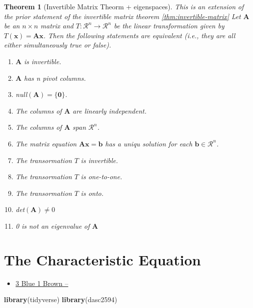 \documentclass[
]{book}
\newenvironment{Shaded}{\begin{snugshade}}{\end{snugshade}}
\newcommand{\KeywordTok}[1]{\textcolor[rgb]{0.13,0.29,0.53}{\textbf{#1}}}
\newcommand{\NormalTok}[1]{#1}
\providecommand{\tightlist}{%
  \setlength{\itemsep}{0pt}\setlength{\parskip}{0pt}}
\newtheorem{theorem}{Theorem}[chapter]
\theoremstyle{definition}
\theoremstyle{definition}
\theoremstyle{definition}
\theoremstyle{definition}
\theoremstyle{remark}
\begin{document}
\begin{theorem}[Invertible Matrix Theorm + eigenspaces]

This is an extension of the prior statement of the invertible matrix theorem \ref{thm:invertible-matrix}
Let \(\mathbf{A}\) be an \(n \times n\) matrix and \(T: \mathcal{R}^n \rightarrow \mathcal{R}^n\) be the linear transformation given by \(T(\mathbf{x}) = \mathbf{A}\mathbf{x}\). Then the following statements are equivalent (i.e., they are all either simultaneously true or false).

\begin{enumerate}
\def\labelenumi{\arabic{enumi})}
\item
  \(\mathbf{A}\) is invertible.
\item
  \(\mathbf{A}\) has n pivot columns.
\item
  null\((\mathbf{A}) = \{\mathbf{0}\}\).
\item
  The columns of \(\mathbf{A}\) are linearly independent.
\item
  The columns of \(\mathbf{A}\) span \(\mathcal{R}^n\).
\item
  The matrix equation \(\mathbf{A} \mathbf{x} = \mathbf{b}\) has a uniqu solution for each \(\mathbf{b} \in \mathcal{R}^n\).
\item
  The transormation \(T\) is invertible.
\item
  The transormation \(T\) is one-to-one.
\item
  The transormation \(T\) is onto.
\item
  det\((\mathbf{A}) \neq 0\)
\item
  0 is not an eigenvalue of \(\mathbf{A}\)
\end{enumerate}

\end{theorem}

\hypertarget{the-characteristic-equation}{%
\chapter{The Characteristic Equation}\label{the-characteristic-equation}}

\begin{itemize}
\tightlist
\item
  \href{https://www.3blue1brown.com/lessons/quick-eigen}{3 Blue 1 Brown --}
\end{itemize}

\begin{Shaded}
\begin{Highlighting}[]
\KeywordTok{library}\NormalTok{(tidyverse)}
\KeywordTok{library}\NormalTok{(dasc2594)}
\end{Highlighting}
\end{Shaded}
\end{document}
